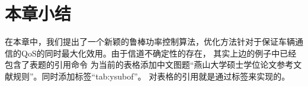 \section{本章小结}\label{section3-5}
在本章中，我们提出了一个新颖的鲁棒功率控制算法，优化方法针对于保证车辆通信的QoS的同时最大化效用。由于信道不确定性的存在，
其实上边的例子中已经包含了表题的引用命令
为当前的表格添加中文图题“燕山大学硕士学位论文参考文献规则”。同时添加标签“tab:ysubof”。 对表格的引用就是通过标签来实现的。
\begin{comment}
\section{表格的引用}\label{section3-6}
表格的引用同样是使用\verb|\ref{}| 命令实现的。例如“表\verb|\ref{tab:ysubof}|” 输出的结果为：表\ref{tab:ysubof}。\LaTeX 会自动将其替换为表格的编号。例如：
\begin{verbatim}
燕山大学硕士学位论文参考文献规则的表格如表\ref{tab:ysubof}所示。
\end{verbatim}
的效果如下：\\
燕山大学硕士学位论文参考文献规则的表格如表\ref{tab:ysubof}所示。

\section{本章小结}\label{section3-7}
注意！从第二章开始应有``本章小结"，主要总结本章所做的主要研究工作，研究成果等内容！！！

\end{comment}

%
